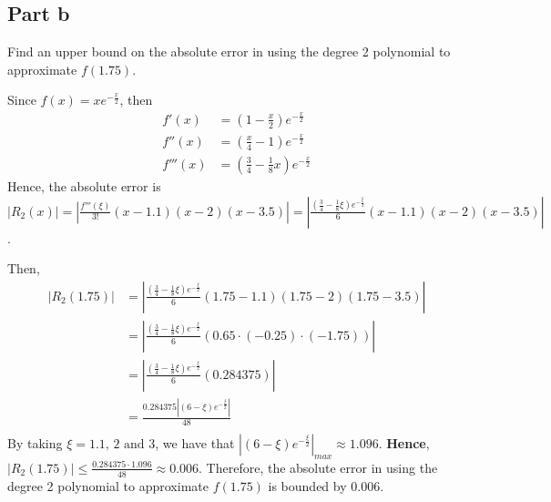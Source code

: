 \subsection{Part b}

\begin{question}
    Find an upper bound on the absolute error in using the degree 2 polynomial to approximate $f(1.75)$.
\end{question}

\begin{answer}
    Since $f(x) = xe^{-\tfrac{x}{2}}$, then 
    \begin{align}
        f'(x) &= (1-\tfrac{x}{2})e^{-\tfrac{x}{2}}\\
        f''(x) &= (\tfrac{x}{4} - 1)e^{-\tfrac{x}{2}}\\
        f'''(x) &= (\tfrac{3}{4} - \tfrac{1}{8}x)e^{-\tfrac{x}{2}}
    \end{align}
    Hence, the absolute error is $\vert R_2(x) \rvert = \left\lvert\tfrac{f'''(\xi)}{3!}(x-1.1)(x-2)(x-3.5)\right\rvert = \left\lvert\tfrac{(\tfrac{3}{4} - \tfrac{1}{8}\xi)e^{-\tfrac{\xi}{2}}}{6}(x-1.1)(x-2)(x-3.5)\right\rvert$.
    
    Then,
    \begin{align}
        \lvert R_2(1.75)\rvert &= \left\lvert\tfrac{(\tfrac{3}{4} - \tfrac{1}{8}\xi)e^{-\tfrac{\xi}{2}}}{6}(1.75-1.1)(1.75-2)(1.75-3.5)\right\rvert\\
        &= \left\lvert\tfrac{(\tfrac{3}{4} - \tfrac{1}{8}\xi)e^{-\tfrac{\xi}{2}}}{6}(0.65\cdot(-0.25)\cdot(-1.75))\right\rvert\\
        &= \left\lvert\tfrac{(\tfrac{3}{4} - \tfrac{1}{8}\xi)e^{-\tfrac{\xi}{2}}}{6}(0.284375)\right\rvert\\
        &= \tfrac{0.284375\left\lvert(6-\xi)e^{-\tfrac{\xi}{2}}\right\rvert}{48}\\
    \end{align}
    By taking $\xi = 1.1, \, 2 \text{ and } 3$, we have that ${\left\lvert(6-\xi)e^{-\tfrac{\xi}{2}}\right\rvert}_{max} \approx 1.096$.
    \textbf{Hence}, $\lvert R_2(1.75)\rvert \leq \tfrac{0.284375\cdot1.096}{48} \approx 0.006$. Therefore, the absolute error in using the degree 2 polynomial to approximate $f(1.75)$ is bounded by $0.006$.
\end{answer}